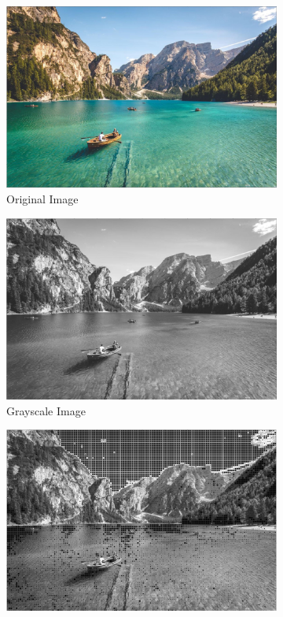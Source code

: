 \documentclass[landscape,a0paper,fontscale=0.5]{baposter} %
\begin{document}
\begin{poster}
{\begin{figure}[H]
	\centering
	\begin{subfigure}{0.3\textwidth} %
		\includegraphics[scale=0.085]{1Land.jpg}
		\caption{Original Image} %
	\end{subfigure}
	\vspace{1em} %
	\begin{subfigure}{0.3\textwidth} %
		\includegraphics[scale=0.085]{2Land.jpg}
		\caption{Grayscale Image} %
	\end{subfigure}
	\begin{subfigure}{0.3\textwidth} %
		\includegraphics[scale=0.085]{3Land.jpg}

\end{subfigure}
\end{figure}}
\end{poster}
\end{document}
